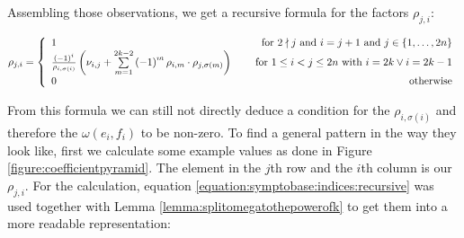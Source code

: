\documentclass[../SymplecticSimplices.tex]{subfiles}
\begin{document}
Assembling those observations, we get a recursive formula for the factors \( \rho_{j,i} \):

\begin{equation}
  \label{equation:symptobase:indices:recursive}
  \rho_{j,i} = \left\lbrace
\begin{array}{llr}
  1 & & \textnormal{ for } 2 \nmid j \textnormal{ and } i = j + 1  \textnormal{ and } j \in \left\lbrace 1, \dots, 2n \right\rbrace \\
  \frac{\left( -1 \right) ^ i}{\rho_{i, \sigma\left( i \right)}} \left( \nu_{i,j} + \sum \limits _{m=1} ^{2k-2} \left( -1 \right) ^m \rho_{i, m} \cdot \rho_{j, \sigma \left( m \right)} \right) & & \textnormal{ for } 1 \leq i < j \leq 2n \textnormal { with } i = 2k \lor i=2k-1 \\
  0 & & \textnormal{otherwise}
\end{array}
\right.
\end{equation}

From this formula we can still not directly deduce a condition for the \( \rho_{i, \sigma \left( i \right)} \) and therefore the \( \omega\left( e_i, f_i \right) \) to be non-zero. To find a general pattern in the way they look like, first we calculate some example values as done in Figure \ref{figure:coefficientpyramid}. The element in the \( j \)th row and the \( i \)th column is our \( \rho_{j,i} \). For the calculation, equation \eqref{equation:symptobase:indices:recursive} was used together with Lemma \ref{lemma:splitomegatothepowerofk} to get them into a more readable representation:
\end{document}
